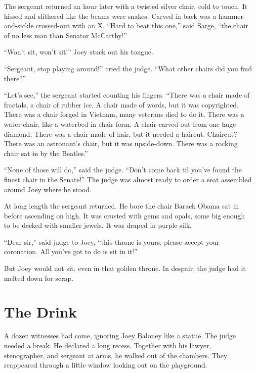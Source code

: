 \documentclass[oneside]{book}
\begin{document}
The sergeant returned an hour later with a twisted silver chair, cold
to touch.  It hissed and slithered
like the beams were snakes.  Carved in back was a
hammer-and-sickle crossed-out with an X.  ``Hard to beat this one,'' said Sarge,
``the chair of no less man than Senator McCarthy!''

``Won't sit, won't sit!'' Joey stuck out his tongue.

``Sergeant, stop playing around!'' cried the judge.
``What other chairs did you find there?''

``Let's see,'' the sergeant started counting his fingers.
``There was a chair made of fractals, a chair of rubber ice.  A chair made of words,
but it was copyrighted.  There was a chair forged in Vietnam, many veterans died
to do it.  There was a water-chair, like a waterbed in chair form.
A chair carved out from one huge diamond.
There was a chair made of hair, but it needed a haircut.
Chaircut?
There was an astronaut's chair, but it was upside-down.
There was a rocking chair sat in by the Beatles.''

``None of those will do,'' said the judge.  ``Don't come back til you've
found the finest chair in the Senate!''  The judge was almost ready to
order a seat assembled around Joey where he stood.

At long length the sergeant returned.  He bore the chair Barack Obama
sat in before ascending on high.  It was crusted with gems and opals, some
big enough to be decked with smaller jewels.  It was draped in purple silk.

``Dear sir,'' said judge to Joey, ``this throne is yours, please accept your
coronation.  All you've got to do is sit in it!''

But Joey would not sit, even in that golden throne.
In despair, the judge had it melted down for scrap.

\chapter{The Drink}


A dozen witnesses had come, ignoring Joey Baloney like a statue.
The judge needed a break.  He declared a long recess.  Together with his lawyer,
stenographer, and sergeant at arms, he walked out of the chambers.
They reappeared through a little window looking out
on the playground.
\end{document}
